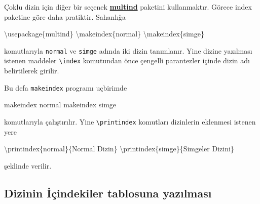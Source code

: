 \documentclass[
  letterpaper,
  DIV=11,
  numbers=noendperiod]{scrreprt}
\newenvironment{Shaded}{\begin{snugshade}}{\end{snugshade}}
\newcommand{\BuiltInTok}[1]{\textcolor[rgb]{0.00,0.23,0.31}{#1}}
\newcommand{\ExtensionTok}[1]{\textcolor[rgb]{0.00,0.23,0.31}{#1}}
\newcommand{\FunctionTok}[1]{\textcolor[rgb]{0.28,0.35,0.67}{#1}}
\newcommand{\NormalTok}[1]{\textcolor[rgb]{0.00,0.23,0.31}{#1}}
\newcommand{\SpecialCharTok}[1]{\textcolor[rgb]{0.37,0.37,0.37}{#1}}
\newcommand{\SpecialStringTok}[1]{\textcolor[rgb]{0.13,0.47,0.30}{#1}}
\begin{document}
Çoklu dizin için diğer bir seçenek
\href{https://www.ctan.org/pkg/multind}{\textbf{multind}} paketini
kullanmaktır. Görece index paketine göre daha pratiktir. Sahanlığa

\begin{Shaded}
\begin{Highlighting}[]
\BuiltInTok{\textbackslash{}usepackage}\NormalTok{\{}\ExtensionTok{multind}\NormalTok{\}}
\FunctionTok{\textbackslash{}makeindex}\NormalTok{\{normal\}}
\FunctionTok{\textbackslash{}makeindex}\NormalTok{\{simge\}}
\end{Highlighting}
\end{Shaded}

komutlarıyla \texttt{normal} ve \texttt{simge} adında iki dizin
tanımlanır. Yine dizine yazılması istenen maddeler
\texttt{\textbackslash{}index} komutundan önce çengelli parantezler
içinde dizin adı belirtilerek girilir.

\begin{Shaded}
\end{Shaded}

Bu defa \texttt{makeindex} programı uçbirimde

\begin{Shaded}
\begin{Highlighting}[]
\ExtensionTok{makeindex}\NormalTok{ normal}
\ExtensionTok{makeindex}\NormalTok{ simge}
\end{Highlighting}
\end{Shaded}

komutlarıyla çalıştırılır. Yine \texttt{\textbackslash{}printindex}
komutları dizinlerin eklenmesi istenen yere

\begin{Shaded}
\begin{Highlighting}[]
\FunctionTok{\textbackslash{}printindex}\NormalTok{\{normal\}\{Normal Dizin\}}
\FunctionTok{\textbackslash{}printindex}\NormalTok{\{simge\}\{Simgeler Dizini\}}
\end{Highlighting}
\end{Shaded}

şeklinde verilir.

\hypertarget{dizinin-iuxe7indekiler-tablosuna-yazux131lmasux131}{%
\subsection{Dizinin İçindekiler tablosuna
yazılması}\label{dizinin-iuxe7indekiler-tablosuna-yazux131lmasux131}}
\end{document}

